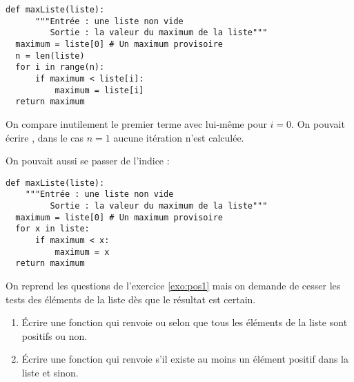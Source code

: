\begin{Answer}
\begin{lstlisting}
def maxListe(liste):
	  """Entrée : une liste non vide
	     Sortie : la valeur du maximum de la liste"""
  maximum = liste[0] # Un maximum provisoire
  n = len(liste)
  for i in range(n):
      if maximum < liste[i]:
          maximum = liste[i]
  return maximum
\end{lstlisting}
On compare inutilement le premier terme avec lui-même pour $i=0$. On pouvait écrire , dans le cas $n=1$ aucune itération n'est calculée.

\medskip

On pouvait aussi se passer de l'indice :
\begin{lstlisting}
def maxListe(liste):
 	"""Entrée : une liste non vide
	     Sortie : la valeur du maximum de la liste"""
  maximum = liste[0] # Un maximum provisoire
  for x in liste:
      if maximum < x:
          maximum = x
  return maximum
\end{lstlisting}
\end{Answer}
\begin{Exercise}[title=Positivité 2]
On reprend les questions de l'exercice \ref{exo:pos1} mais on demande de cesser les tests des éléments de la liste dès que le résultat est certain.
\begin{enumerate}
    \item Écrire une fonction  qui renvoie  ou  selon que tous les éléments de la liste sont positifs ou non.
    \item Écrire une fonction  qui renvoie  s'il existe au moins un élément positif dans la liste et  sinon.
\end{enumerate}
\end{Exercise}
